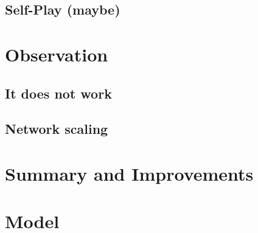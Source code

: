 \documentclass[12pt]{article}
\begin{document}
\subsection{Self-Play (maybe)}

\section{Observation}
\subsection{It does not work}
\subsection{Network scaling} %



\section{Summary and Improvements}






\section{Model}
\end{document}

